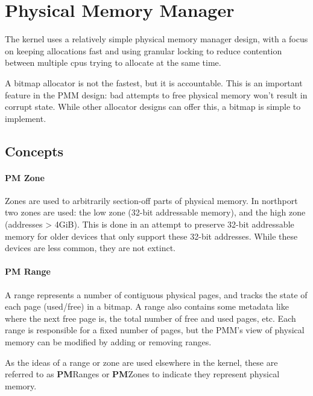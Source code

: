 \section{Physical Memory Manager}
The kernel uses a relatively simple physical memory manager design, with a focus on keeping allocations fast and using granular locking to reduce contention between multiple cpus trying to allocate at the same time.

A bitmap allocator is not the fastest, but it is accountable. This is an important feature in the PMM design: bad attempts to free physical memory won't result in corrupt state. While other allocator designs can offer this, a bitmap is simple to implement.

\subsection{Concepts}
\paragraph{PM Zone}
Zones are used to arbitrarily section-off parts of physical memory. In northport two zones are used: the low zone (32-bit addressable memory), and the high zone (addresses > 4GiB).
This is done in an attempt to preserve 32-bit addressable memory for older devices that only support these 32-bit addresses. While these devices are less common, they are not extinct.

\paragraph{PM Range}
A range represents a number of contiguous physical pages, and tracks the state of each page (used/free) in a bitmap. A range also contains some metadata like where the next free page is, the total number of free and used pages, etc. Each range is responsible for a fixed number of pages, but the PMM's view of physical memory can be modified by adding or removing ranges.

As the ideas of a range or zone are used elsewhere in the kernel, these are referred to as \textbf{PM}Ranges or \textbf{PM}Zones to indicate they represent physical memory.

